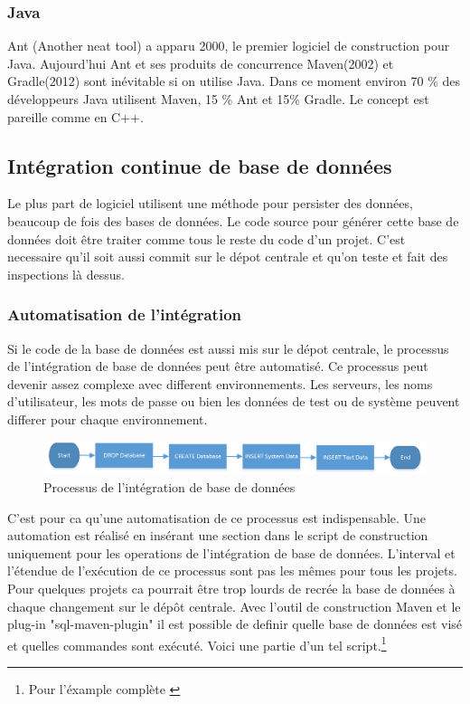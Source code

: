 \subsubsection{Java}
Ant (Another neat tool) a apparu 2000, le premier logiciel de construction pour Java.
Aujourd'hui Ant et ses produits de concurrence Maven(2002) et Gradle(2012) sont inévitable si on utilise Java.
Dans ce moment environ 70 \% des développeurs Java utilisent Maven, 15 \% Ant et 15\% Gradle. Le concept est pareille comme en C++.


\subsection{Intégration continue de base de données}

Le plus part de logiciel utilisent une méthode pour persister des données, beaucoup de fois des bases de données. Le code source pour générer cette base de données doit être traiter comme tous le reste du code d'un projet. C'est necessaire qu'il soit aussi commit sur le dépot centrale et qu'on teste et fait des inspections là dessus.

\subsubsection{Automatisation de l'intégration}
Si le code de la base de données est aussi mis sur le dépot centrale, le processus de l'intégration de base de données peut être automatisé. Ce processus peut devenir assez complexe avec different environnements. Les serveurs, les noms d'utilisateur, les mots de passe ou bien les données de test ou de système peuvent differer pour chaque environnement.
\begin{figure}[H]
	\centering
		\includegraphics[scale=1]{bilder/database_integration}
	\caption{Processus de l'intégration de base de données}
	\label{fig:processus}
\end{figure}

C'est pour ca qu'une automatisation de ce processus est indispensable. Une automation est réalisé en insérant une section dans le script de construction uniquement pour les operations de l'intégration de base de données. L'interval et l'étendue de l'exécution de ce processus sont pas les mêmes pour tous les projets. Pour quelques projets ca pourrait être trop lourds de recrée la base de données à chaque changement sur le dépôt centrale. Avec l'outil de construction Maven et le plug-in "sql-maven-plugin" il est possible de definir quelle base de données est visé et quelles commandes sont exécuté. Voici une partie d'un tel script.\footnote{Pour l'éxample complète \cite{mvnsql}}

